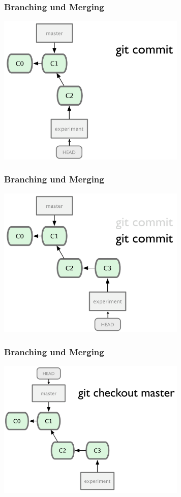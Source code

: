 \begin{frame}
  \frametitle{Branching und Merging}
  \begin{center}
    \includegraphics[width=9cm]{img/branch_2.pdf}
  \end{center}
\end{frame}

\begin{frame}
  \frametitle{Branching und Merging}
  \begin{center}
    \includegraphics[width=9cm]{img/branch_3.pdf}
  \end{center}
\end{frame}

\begin{frame}
  \frametitle{Branching und Merging}
  \begin{center}
    \includegraphics[width=9cm]{img/branch_4.pdf}
  \end{center}
\end{frame}

